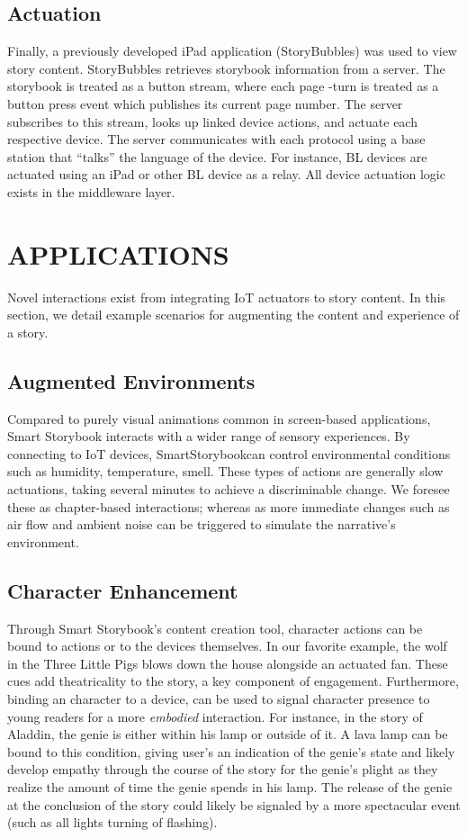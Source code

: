 \documentclass{sigchi}
\newcommand\name{SmartStorybook}
\begin{document}
\subsection{Actuation}
Finally, a previously developed iPad application (StoryBubbles) was used to view story content. StoryBubbles retrieves storybook information from a server. The storybook is treated as a button stream, where each page -turn is treated as a button press event which publishes its current page number. The server subscribes to this stream, looks up linked device actions, and actuate each respective device. 
The server communicates with each protocol using a base station that ``talks'' the language of the device. For instance, BL devices are actuated using an iPad or other BL device as a relay. All device actuation logic exists in the middleware layer. 



\section{APPLICATIONS}
Novel interactions exist from integrating IoT actuators to story content. In this section, we detail example scenarios for augmenting the content and experience of a story. 

\subsection{Augmented Environments}
Compared to purely visual animations common in screen-based applications, Smart Storybook interacts with a wider range of sensory experiences. By connecting to IoT devices, \name can control environmental conditions such as humidity, temperature, smell. These types of actions are generally slow actuations, taking several minutes to achieve a discriminable change. We foresee these as chapter-based interactions; whereas as more immediate changes such as air flow and ambient noise can be triggered to simulate the narrative's environment.


\subsection{Character Enhancement}
Through Smart Storybook's content creation tool, character actions can be bound to actions or to the devices themselves. In our favorite example, the wolf in the Three Little Pigs blows down the house alongside an actuated fan. These cues add theatricality to the story, a key component of engagement. Furthermore, binding an character to a device, can be used to signal character presence to young readers for a more \textit{embodied} interaction. For instance, in the story of Aladdin, the genie is either within his lamp or outside of it. A lava lamp can be bound to this condition, giving user's an indication of the genie's state and likely develop empathy through the course of the story for the genie's plight as they realize the amount of time the genie spends in his lamp. The release of the genie at the conclusion of the story could likely be signaled by a more spectacular event (such as all lights turning of flashing). 
\end{document}
